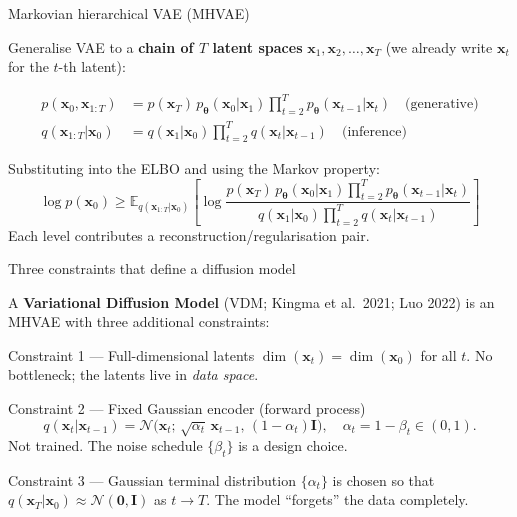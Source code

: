 \documentclass[aspectratio=169,11pt]{beamer}
\newcommand{\E}{\mathbb{E}}
\newcommand{\Norm}{\mathcal{N}}
\newcommand{\bx}{\bm{x}}
\newcommand{\btheta}{\bm{\theta}}
\begin{document}
\begin{frame}{Markovian hierarchical VAE (MHVAE)}

Generalise VAE to a \textbf{chain of $T$ latent spaces}
$\bx_1,\bx_2,\ldots,\bx_T$ (we already write $\bx_t$ for the $t$-th latent):

\begin{align*}
p(\bx_0,\bx_{1:T})
  &= p(\bx_T)\,p_{\btheta}(\bx_0|\bx_1)
     \prod_{t=2}^{T}p_{\btheta}(\bx_{t-1}|\bx_t)
     \quad\text{(generative)}\\[4pt]
q(\bx_{1:T}|\bx_0)
  &= q(\bx_1|\bx_0)
     \prod_{t=2}^{T}q(\bx_t|\bx_{t-1})
     \quad\text{(inference)}
\end{align*}

Substituting into the ELBO and using the Markov property:
\[
\log p(\bx_0)
\geq
\E_{q(\bx_{1:T}|\bx_0)}
\!\left[\log\frac{
    p(\bx_T)\,p_{\btheta}(\bx_0|\bx_1)
    \prod_{t=2}^{T}p_{\btheta}(\bx_{t-1}|\bx_t)}
  {q(\bx_1|\bx_0)\prod_{t=2}^{T}
    q(\bx_t|\bx_{t-1})}\right]
\]
Each level contributes a reconstruction/regularisation pair.
\end{frame}

\begin{frame}{Three constraints that define a diffusion model}

A \textbf{Variational Diffusion Model} (VDM; Kingma et al.\ 2021;
Luo 2022) is an MHVAE with three additional constraints:

\begin{block}{Constraint 1 — Full-dimensional latents}
$\dim(\bx_t) = \dim(\bx_0)$ for all $t$.
No bottleneck; the latents live in \emph{data space}.
\end{block}

\begin{block}{Constraint 2 — Fixed Gaussian encoder (forward process)}
\[
q(\bx_t|\bx_{t-1})
= \Norm\!\bigl(\bx_t;\,\sqrt{\alpha_t}\,\bx_{t-1},\,(1-\alpha_t)\mathbf{I}\bigr),
\quad \alpha_t = 1-\beta_t\in(0,1).
\]
Not trained. The noise schedule $\{\beta_t\}$ is a design choice.
\end{block}

\begin{block}{Constraint 3 — Gaussian terminal distribution}
$\{\alpha_t\}$ is chosen so that
$q(\bx_T|\bx_0)\approx\Norm(\bm{0},\mathbf{I})$
as $t\to T$.
The model ``forgets'' the data completely.
\end{block}
\end{frame}
\end{document}
